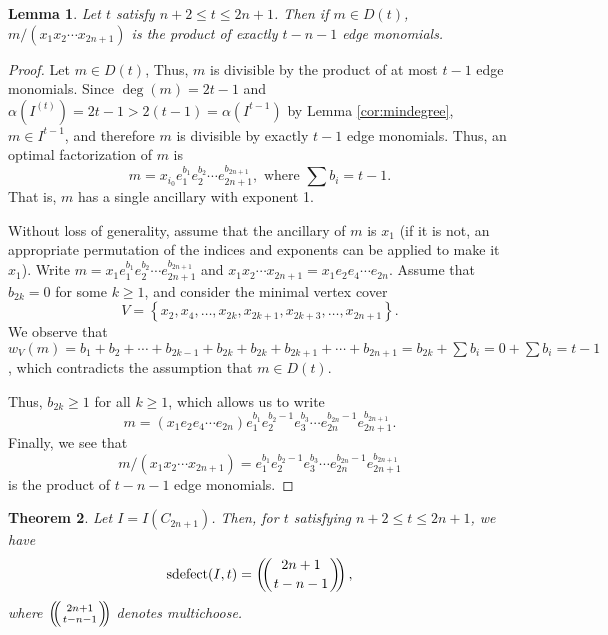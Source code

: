 \documentclass[12pt]{amsart}
\def\multichoose#1#2{\ensuremath{\left(\kern-.3em\left(\genfrac{}{}{0pt}{}{#1}{#2}\right)\kern-.3em\right)}}
\def\set#1{\left\{ {#1} \right\}}
\def\sdefect{\operatorname{sdefect}}
\renewcommand{\ge}{\geqslant}
\renewcommand{\le}{\leqslant}
\theoremstyle{plain}
\newtheorem{theorem}{Theorem}[section]
\newtheorem{lem}[theorem]{Lemma}
\theoremstyle{definition}
\begin{document}
\begin{lem}\label{lem:edgemonomialproducts}
	Let $t$ satisfy $n+2\le t\le 2n+1$.
	Then if $m\in D(t)$, $m/(x_1 x_2 \cdots x_{2n+1})$ is the product of exactly $t-n-1$ edge monomials.
\end{lem}

\begin{proof}
	Let $m\in D(t)$, %
	Thus, $m$ is divisible by the product of at most $t-1$ edge monomials.
	Since $\deg(m)=2t-1$ and $\alpha(I^{(t)}) = 2t - 1 > 2(t-1) = \alpha(I^{t-1})$ by Lemma \ref{cor:mindegree}, $m\in I^{t-1}$, and therefore $m$ is divisible by exactly $t-1$ edge monomials.
	Thus, an optimal factorization of $m$ is
	\[
		m = x_{i_0} e_1^{b_1} e_2^{b_2} \cdots e_{2n+1}^{b_{2n+1}}, \text{ where } \sum b_i = t-1.
	\]
	That is, $m$ has a single ancillary with exponent 1.
	
	
	Without loss of generality, assume that the ancillary of $m$ is $x_1$ (if it is not, an appropriate permutation of the indices and exponents can be applied to make it $x_1$).
	Write $m = x_1 e_1^{b_1} e_2^{b_2} \cdots e_{2n+1}^{b_{2n+1}}$ and $x_1 x_2 \cdots x_{2n+1} = x_1 e_2 e_4 \cdots e_{2n}$.
	Assume that $b_{2k} = 0$ for some $k\ge 1$, and consider the minimal vertex cover
	\[
		V = \set{x_2, x_4, \ldots, x_{2k}, x_{2k+1}, x_{2k+3}, \ldots, x_{2n+1}}.
	\]
	We observe that $w_V(m) = b_1 + b_2 + \cdots + b_{2k-1} + b_{2k} + b_{2k} + b_{2k+1} + \cdots + b_{2n+1} = b_{2k} + \sum b_i = 0 + \sum b_i = t-1$, which contradicts the assumption that $m\in D(t)$.
	
	Thus, $b_{2k} \ge 1$ for all $k\ge 1$, which allows us to write
	\[
		m = (x_1 e_2 e_4 \cdots e_{2n}) e_1^{b_1} e_2^{b_2-1} e_3^{b_3} \cdots e_{2n}^{b_{2n}-1} e_{2n+1}^{b_{2n+1}}.
	\]
	Finally, we see that
	\[
		m/(x_1 x_2\cdots x_{2n+1}) = e_1^{b_1} e_2^{b_2-1} e_3^{b_3} \cdots e_{2n}^{b_{2n}-1} e_{2n+1}^{b_{2n+1}}
	\]
	is the product of $t-n-1$ edge monomials.
\end{proof}

\begin{theorem}\label{thm:sdefects}
	Let $I = I(C_{2n+1})$.
	Then, for $t$ satisfying $n+2\le t \le 2n+1$, we have
	\[
		\sdefect(I,t) = \multichoose{2n+1}{t-n-1}, %
	\]
	where $\multichoose{2n+1}{t-n-1}$ denotes multichoose.
\end{theorem}
\end{document}

